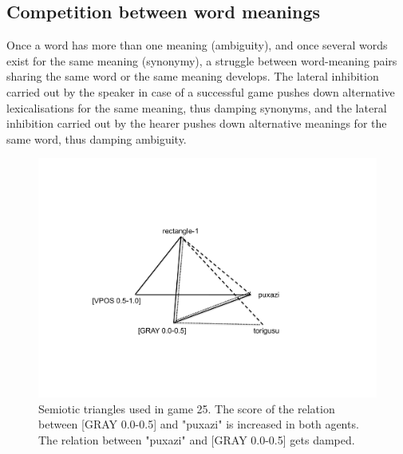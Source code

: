 \subsection{Competition between word meanings }

Once a word has more than one meaning (ambiguity), 
and once several words exist for the same meaning 
(synonymy), a struggle between word-meaning
pairs sharing the same word or the 
same meaning develops. The lateral inhibition carried out by the 
speaker in case of a successful game pushes
down alternative lexicalisations for the same meaning, 
thus damping synonyms, and the lateral inhibition carried out 
by the hearer pushes down alternative meanings for the 
same word, thus damping ambiguity. 
\begin{figure}[htbp]
  \centerline{\includegraphics[width=.60\textwidth]{chap6/figs/triangle5}}
\caption{\label{triangle5} Semiotic triangles used 
in game 25. The score of the relation between [GRAY 0.0-0.5] and 
"puxazi" is increased in both agents. The relation between "puxazi" and 
[GRAY 0.0-0.5] gets damped.}
\end{figure}

